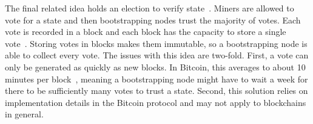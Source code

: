 
The final related idea holds an election to verify state~\cite{matzutt2020HowTSPrune}.
Miners are allowed to vote for a state and then bootstrapping nodes trust the majority of votes.
Each vote is recorded in a block and each block has the capacity to store a single vote~\cite{matzutt2020HowTSPrune}.
Storing votes in blocks makes them immutable, so a bootstrapping node is able to collect every vote.
The issues with this idea are two-fold.
First, a vote can only be generated as quickly as new blocks.
In Bitcoin, this averages to about 10 minutes per block~\cite{nakamoto2009Bitcoin}, meaning a bootstrapping node might have to wait a week for there to be sufficiently many votes to trust a state.
Second, this solution relies on implementation details in the Bitcoin protocol and may not apply to blockchains in general.
